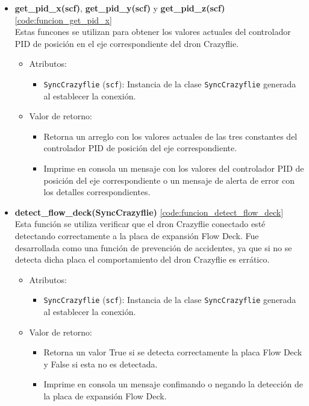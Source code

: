\begin{itemize}
	\item \textbf{get\_pid\_x(scf)}, \textbf{get\_pid\_y(scf)} y \textbf{get\_pid\_z(scf)} \ref{code:funcion_get_pid_x}\\
	Estas funcones se utilizan para obtener los valores actuales del controlador PID de posición en el eje correspondiente del dron Crazyflie.
	\begin{itemize}
		\item Atributos:
		\begin{itemize}
			\item \texttt{SyncCrazyflie} (\texttt{scf}): Instancia de la clase \texttt{SyncCrazyflie} generada al establecer la conexión.
		\end{itemize}
		\item Valor de retorno:
		\begin{itemize}
			\item Retorna un arreglo con los valores actuales de las tres constantes del controlador PID de posición del eje correspondiente.
			\item Imprime en consola un mensaje con los valores del controlador PID de posición del eje correspondiente o un mensaje de alerta de error con los detalles correspondientes.
		\end{itemize}
	\end{itemize}
	\vspace{1mm} %
	
	\item \textbf{detect\_flow\_deck(SyncCrazyflie)} \ref{code:funcion_detect_flow_deck}\\ 
	Esta función se utiliza verificar que el dron Crazyflie conectado esté detectando correctamente a la placa de expansión Flow Deck. Fue desarrollada como una función de prevención de accidentes, ya que si no se detecta dicha placa el comportamiento del dron Crazyflie es errático. 
	\begin{itemize}
		\item Atributos:
		\begin{itemize}
			\item \texttt{SyncCrazyflie} (\texttt{scf}): Instancia de la clase \texttt{SyncCrazyflie} generada al establecer la conexión.
		\end{itemize}
		\item Valor de retorno:
		\begin{itemize}
			\item Retorna un valor True si se detecta correctamente la placa Flow Deck y False si esta no es detectada. 
			\item Imprime en consola un mensaje confimando o negando la detección de la placa de expansión Flow Deck.
		\end{itemize}
	\end{itemize} 
	\vspace{5mm} %
\end{itemize}

